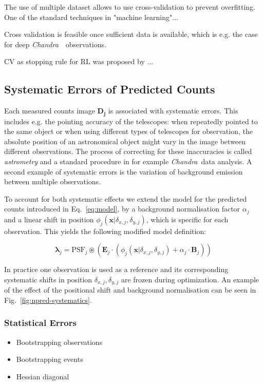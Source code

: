 \documentclass[twocolumn]{aastex631}
\newcommand{\chandra}{\textit{Chandra}~}
\begin{document}
    The use of multiple dataset allows to use cross-validation to prevent overfitting.
    One of the standard techniques in "machine learning"...

    Cross validation is feasible once sufficient data is available, which is e.g. the 
    case for deep \chandra~observations.

    CV as stopping rule for RL was proposed by \cite{Reeves1995}...

    \subsection{Systematic Errors of Predicted Counts}
    Each measured counts image $\mathbf{D_j}$ is associated with systematic errors.
    This includes e.g. the pointing accuracy of the telescopes: when repeatedly pointed
    to the same object or when using different types of telescopes for observation, the
    absolute position of an astronomical object might vary in the image between different
    observations. The process of correcting for these inaccuracies is called \textit{astrometry} and a standard procedure in for example \chandra data analysis.
    A second example of systematic errors is the variation of background emission
    between multiple observations.
    
    To account for both systematic effects we extend the model for the predicted
    counts introduced in Eq.~\ref{eq:model}, by a background normalisation factor
    $\alpha_j$ and a linear shift in position $\phi_j(\mathbf{x}| \delta_{x,j}, \delta_{y,j})$, which is specific for each observation. This yields the following modified model definition:
    
    \begin{equation}
        \label{eq:model-npred-calibration}
        \mathbf{\lambda}_j = \mathrm{PSF}_j \circledast \left(\mathbf{E}_j \cdot (\phi_j(\mathbf{x}| \delta_{x,j}, \delta_{y,j}) + \alpha_j \cdot \mathbf{B}_j) \right)
    \end{equation}
    
    In practice one observation is used as a reference and its corresponding
    systematic shifts in position $\delta_{x,j}, \delta_{y,j}$ are frozen during
    optimization. An example of the effect of the positional shift and background
    normalisation can be seen in Fig.~\ref{fig:npred-systematics}.

    \subsubsection{Statistical Errors}
    \begin{itemize}
        \item Bootstrapping observations
        \item Bootstrapping events
        \item Hessian diagonal
    \end{itemize}
    
\end{document}
